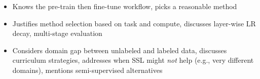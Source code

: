 \begin{interviewq}

\goodgreat
\begin{itemize}
    \item {} Knows the pre-train then fine-tune workflow, picks a reasonable method
    \item {} Justifies method selection based on task and compute, discusses layer-wise LR decay, multi-stage evaluation
    \item {} Considers domain gap between unlabeled and labeled data, discusses curriculum strategies, addresses when SSL might \textit{not} help (e.g., very different domains), mentions semi-supervised alternatives
\end{itemize}

\end{interviewq}

